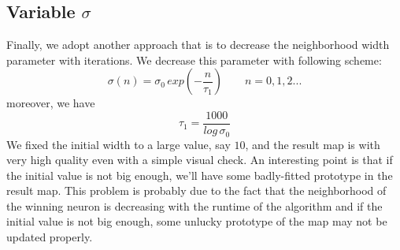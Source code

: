 \documentclass[a4paper, 12pt]{article}
\begin{document}
\subsection{Variable $\sigma$}
Finally, we adopt another approach that is to decrease the
neighborhood width parameter with iterations.
We decrease this parameter with following scheme:
\begin{equation}
  \sigma (n) = \sigma _0 \, exp(-\frac{n}{\tau _1}) \qquad n = 0, 1, 2 ...
\end{equation}
moreover, we have
\begin{equation}
  \tau _1 = \frac{1000}{log \, \sigma _0}
\end{equation}
We fixed the initial width to a large value, say $10$, and the result
map is with very high quality even with a simple visual check. An
interesting point is that if the initial value is not big enough,
we'll have some badly-fitted prototype in the result map. This problem
is probably due to the fact that the neighborhood of the winning
neuron is decreasing with the runtime of the algorithm and if the
initial value is not big enough, some unlucky prototype of the map may
not be updated properly.
\end{document}
